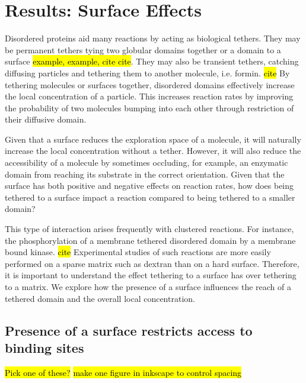 \documentclass[../../AdvancementSummary.tex]{subfiles}
\begin{document}
\section{Results: Surface Effects}

Disordered proteins aid many reactions by acting as biological tethers. They may be permanent tethers tying two globular domains together or a domain to a surface \hl{example, example, cite cite}.  They may also be transient tethers, catching diffusing particles and tethering them to another molecule, i.e. formin. \hl{cite} By tethering molecules or surfaces together, disordered domains effectively increase the local concentration of a particle. This increases reaction rates by improving the probability of two molecules bumping into each other through restriction of their diffusive domain.

Given that a surface reduces the exploration space of a molecule, it will naturally increase the local concentration without a tether. However, it will also reduce the accessibility of a molecule by sometimes occluding, for example, an enzymatic domain from reaching its substrate in the correct orientation. Given that the surface has both positive and negative effects on reaction rates, how does being tethered to a surface impact a reaction compared to being tethered to a smaller domain? 

This type of interaction arises frequently with clustered reactions.  For instance, the phosphorylation of a membrane tethered disordered domain by a membrane bound kinase. \hl{cite} Experimental studies of such reactions are more easily performed on a sparse matrix such as dextran than on a hard surface. Therefore, it is important to understand the effect tethering to a surface has over tethering to a matrix. We explore how the presence of a surface influences the reach of a tethered domain and the overall local concentration.

\subsection{Presence of a surface restricts access to binding sites}


\hl{Pick one of these?}
\hl{make one figure in inkscape to control spacing}
\end{document}
